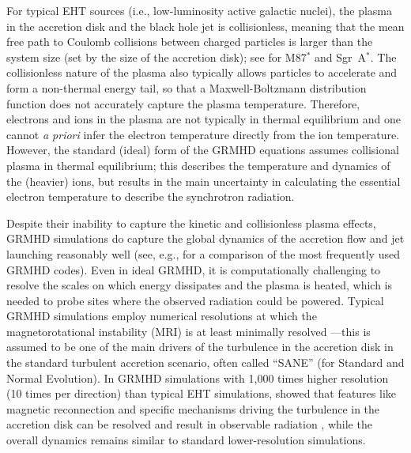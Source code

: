 \documentclass[graybox,envcountchap]{svmult}
\begin{document}
For typical EHT sources (i.e., low-luminosity active galactic nuclei), the plasma in the accretion disk and the black hole jet is collisionless, meaning that the mean free path to Coulomb collisions between charged particles is larger than the system size (set by the size of the accretion disk); see \cite{EHT2019V} for M87$^*$ and \cite{EHT2022V} Sgr~A$^*$.
The collisionless nature of the plasma also typically allows particles to accelerate and form a non-thermal energy tail, so that a Maxwell-Boltzmann distribution function does not accurately capture the plasma temperature. 
Therefore, electrons and ions in the plasma are not typically in thermal equilibrium and one cannot \emph{a priori} infer the electron temperature directly from the ion temperature.
However, the standard (ideal) form of the GRMHD equations assumes collisional plasma in thermal equilibrium; this describes the temperature and dynamics of the (heavier) ions, but results in the main uncertainty in calculating the essential electron temperature to describe the synchrotron radiation.

\bigskip

Despite their inability to capture the kinetic and collisionless plasma effects, GRMHD simulations do capture the global dynamics of the accretion flow and jet launching reasonably well (see, e.g., \cite{Porth2019} for a comparison of the most frequently used GRMHD codes). 
Even in ideal GRMHD, it is computationally challenging to resolve the scales on which energy dissipates and the plasma is heated, which is needed to probe sites where the observed radiation could be powered.
Typical GRMHD simulations employ numerical resolutions at which the magnetorotational instability (MRI) is at least minimally resolved \cite{Porth2019}---this is assumed to be one of the main drivers of the turbulence in the accretion disk in the standard turbulent accretion scenario, often called ``SANE'' (for Standard and Normal Evolution). 
In GRMHD simulations with 1,000 times higher resolution (10 times per direction) than typical EHT simulations, \cite{Ripperda2022} showed that features like magnetic reconnection and specific mechanisms driving the turbulence in the accretion disk can be resolved and result in observable radiation \cite{Hakobyan2023,Zhdankin2023}, while the overall dynamics remains similar to standard lower-resolution simulations.
\end{document}
